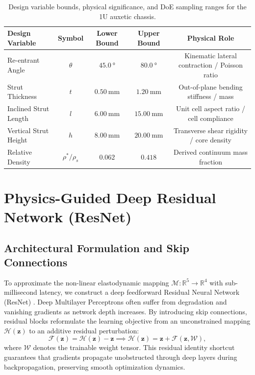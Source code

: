 \begin{table}[htbp]
\centering
\caption{Design variable bounds, physical significance, and DoE sampling ranges for the 1U auxetic chassis.}
\label{tab:doe_parameters}
\begin{tabular*}{\textwidth}{@{\extracolsep{\fill}}lcccc@{\extracolsep{\fill}}}
\toprule
\textbf{Design Variable} & \textbf{Symbol} & \textbf{Lower Bound} & \textbf{Upper Bound} & \textbf{Physical Role} \\
\midrule
Re-entrant Angle & $\theta$ & $\SI{45.0}{\degree}$ & $\SI{80.0}{\degree}$ & Kinematic lateral contraction / Poisson ratio \\
Strut Thickness & $t$ & $\SI{0.50}{\milli\meter}$ & $\SI{1.20}{\milli\meter}$ & Out-of-plane bending stiffness / mass \\
Inclined Strut Length & $l$ & $\SI{6.00}{\milli\meter}$ & $\SI{15.00}{\milli\meter}$ & Unit cell aspect ratio / cell compliance \\
Vertical Strut Height & $h$ & $\SI{8.00}{\milli\meter}$ & $\SI{20.00}{\milli\meter}$ & Transverse shear rigidity / core density \\
Relative Density & $\rho^*/\rho_s$ & $0.062$ & $0.418$ & Derived continuum mass fraction \\
\bottomrule
\end{tabular*}
\end{table}

\section{Physics-Guided Deep Residual Network (ResNet)}
\label{sec:resnet_architecture}

\subsection{Architectural Formulation and Skip Connections}

To approximate the non-linear elastodynamic mapping $\mathcal{M}: \mathbb{R}^5 \to \mathbb{R}^4$ with sub-millisecond latency, we construct a deep feedforward Residual Neural Network (ResNet) \cite{he2016}. Deep Multilayer Perceptrons often suffer from degradation and vanishing gradients as network depth increases. By introducing skip connections, residual blocks reformulate the learning objective from an unconstrained mapping $\mathcal{H}(\mathbf{z})$ to an additive residual perturbation:
\begin{equation}
\mathcal{F}(\mathbf{z}) = \mathcal{H}(\mathbf{z}) - \mathbf{z} \implies \mathcal{H}(\mathbf{z}) = \mathbf{z} + \mathcal{F}(\mathbf{z}, \mathcal{W}),
\label{eq:residual_formulation}
\end{equation}
where $\mathcal{W}$ denotes the trainable weight tensor. This residual identity shortcut guarantees that gradients propagate unobstructed through deep layers during backpropagation, preserving smooth optimization dynamics.

